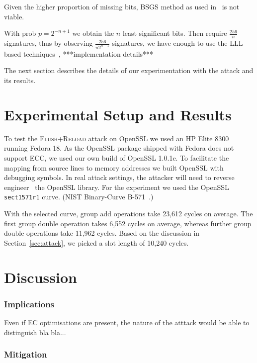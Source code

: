\documentclass[twocolumn]{article}
\newcommand{\fl}{\textsc{Flu\-sh+\allowbreak Re\-load}\xspace}
\newcommand{\myupcase}[1]{\uppercase{#1}}
\begin{document}
Given the higher proportion of missing bits, BSGS method as used in~\cite{yarom_benger_2013} is not viable. 

With prob $p=2^{-n+1}$ we obtain the $n$ least significant bits. Then require $\frac{256}{n}$ signatures, thus by observing $\frac{256}{n2^{n-1}}$ signatures, we have enough to use the LLL based techniques~\cite{nguyen03insecurity}, ***implementation details***



The next section describes the details of our experimentation with the attack and its results.

\section{Experimental Setup and Results}\label{sec:results}

To test the \fl attack on OpenSSL we used an HP Elite 8300 running Fedora 18. As the OpenSSL package shipped with Fedora does not support \myupcase{ecc},
we used our own build of OpenSSL 1.0.1e. To facilitate the mapping from source lines to memory addresses we built OpenSSL with debugging symbols.
In real attack settings, the attacker will need to reverse engineer~\cite{cipsero10software} the OpenSSL library. For the experiment we used the OpenSSL \texttt{sect1571r1} curve. (NIST Binary-Curve B-571~\cite{fips}.)

With the selected curve, group add operations take 23,612 cycles on average. The first group double operation takes 6,552 cycles on average, whereas further group double operations take 11,962 cycles. Based on the discussion in Section~\ref{sec:attack}, we picked a slot length of 10,240 cycles.




\section{Discussion}\label{sec:discussion}


\subsubsection*{Implications}
Even if EC optimisations are present, the nature of the atttack would be able to distinguish bla bla... 


\subsubsection*{Mitigation}
\end{document}
